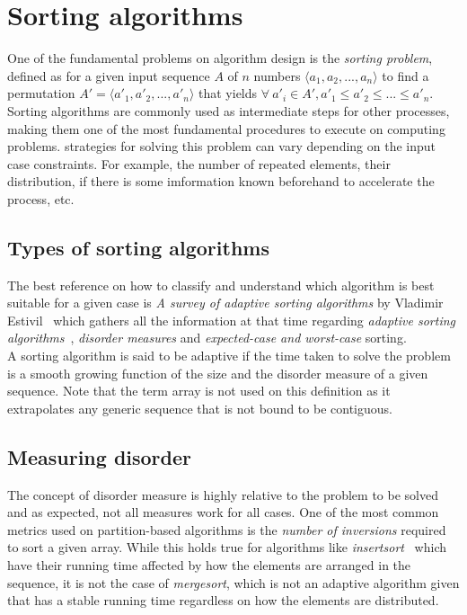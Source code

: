 \section{Sorting algorithms}
One of the fundamental problems on algorithm design is the \textit{sorting problem}, defined as for a given input sequence $A$ of $n$ numbers $\langle a_1, a_2,...,a_n \rangle$ to find a permutation $A' = \langle a'_1, a'_2,...,a'_n \rangle$ that yields $\forall~a'_i \in A', a'_1 \leq a'_2 \leq ... \leq a'_n $.\\

Sorting algorithms are commonly used as intermediate steps for other processes, making them one of the most fundamental procedures to execute on computing problems. strategies for solving this problem can vary depending on the input case constraints. For example, the number of repeated elements, their distribution, if there is some imformation known beforehand to accelerate the process, etc.\\

\subsection{Types of sorting algorithms}
The best reference on how to classify and understand which algorithm is best suitable for a given case is \textit{A survey of adaptive sorting algorithms} by Vladimir Estivil~\cite{estivil92} which gathers all the information at that time regarding \textit{adaptive sorting algorithms}~\cite{Mehlhorn_1984}, \textit{disorder measures} and \textit{expected-case and worst-case} sorting.\\

A sorting algorithm is said to be adaptive if the time taken to solve the problem is a smooth growing function of the size and the disorder measure of a given sequence. Note that the term array is not used on this definition as it extrapolates any generic sequence that is not bound to be contiguous.\\

\subsection{Measuring disorder}
\label{SEC:MEASURING_DISORDER}
The concept of disorder measure is highly relative to the problem to be solved and as expected, not all measures work for all cases. One of the most common metrics used on partition-based algorithms is the \textit{number of inversions} required to sort a given array. While this holds true for algorithms like \textit{insertsort}~\cite{10.5555/150918} which have their running time affected by how the elements are arranged in the sequence, it is not the case of \textit{mergesort}, which is not an adaptive algorithm given that has a stable running time regardless on how the elements are distributed. \\

